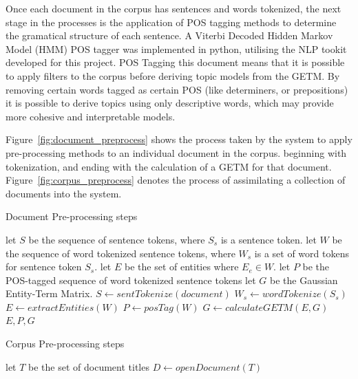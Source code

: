 \documentclass[10pt]{report}
\begin{document}
Once each document in the corpus has sentences and words tokenized, the next stage in the processes is the application of POS tagging methods to determine the gramatical structure of each sentence. A Viterbi Decoded Hidden Markov Model (HMM) POS tagger was implemented in python, utilising the NLP tookit developed for this project. POS Tagging this document means that it is possible to apply filters to the corpus before deriving topic models from the GETM. By removing certain words tagged as certain POS (like determiners, or prepositions) it is possible to derive topics using only descriptive words, which may provide more cohesive and interpretable models.

Figure~\ref{fig:document_preprocess} shows the process taken by the system to apply pre-processing methods to an individual document in the corpus. beginning with tokenization, and ending with the calculation of a GETM for that document. Figure~\ref{fig:corpus_preprocess} denotes the process of assimilating a collection of documents into the system.

\renewcommand{\baselinestretch}{1.0}\normalsize
\begin{algorithm}[H]
  \caption{Document Pre-processing steps\label{fig:document_preprocess}}
  \begin{algorithmic}
   
    \State let $S$ be the sequence of sentence tokens, where $S_s$ is a sentence token.
    \State let $W$ be the sequence of word tokenized sentence tokens, where $W_s$ is a set of word tokens for sentence token $S_s$.
    \State let $E$ be the set of entities where $E_e \in W$.
    \State let $P$ be the POS-tagged sequence of word tokenized sentence tokens
    \State let $G$ be the Gaussian Entity-Term Matrix.
    \State
    \State $S\gets sentTokenize(document)$
      \State $W_s \gets wordTokenize(S_s)$
      \EndFor
      \State 
    \State $E \gets extractEntities(W)$
    \State $P \gets posTag(W)$
    \State $G \gets calculateGETM(E, G)$
    \State
    \Return $E, P, G$
    
  \end{algorithmic}
\end{algorithm}
\renewcommand{\baselinestretch}{2.0}\normalsize

\renewcommand{\baselinestretch}{1.0}\normalsize
\begin{algorithm}[H]
  \caption{Corpus Pre-processing steps\label{fig:corpus_preprocess}}
  \begin{algorithmic}
    \State let $T$ be the set of document titles
      \State $D \gets openDocument(T)$
    \EndFor
  \end{algorithmic}
\end{algorithm}
\renewcommand{\baselinestretch}{2.0}\normalsize
\end{document}
